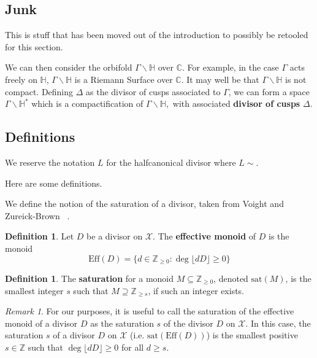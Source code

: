 \documentclass{amsart}
\theoremstyle{plain}
\theoremstyle{definition}
\newtheorem{defn}[thm]{Definition}
\theoremstyle{remark}
\newtheorem{rem}[thm]{Remark}
\numberwithin{equation}{section}
\newcommand\bh{{\mathbb H}}
\newcommand\BC{{\mathbb C}}
\newcommand\BZ{{\mathbb Z}}
\newcommand \sx{\mathscr X}
\newcommand \halfcan{L}
\newcommand \Eff{\text{Eff}}
\newcommand \sat{\text{sat}}
\begin{document}
\subsection{Junk}
This is stuff that has been moved out of the introduction to possibly
be retooled for this section.

We can then consider the
orbifold $\Gamma \backslash \bh$ over $\BC$. For example, in the
case $\Gamma$ acts freely on $\bh$, $\Gamma \backslash \bh$ is a
Riemann Surface over $\BC$. It may well be that $\Gamma \backslash
\bh$ is not compact. Defining $\Delta$ as the divisor of cusps
associated to $\Gamma$, we can form a space $\Gamma \backslash
\bh^*$ which is a compactification of $\Gamma \backslash \bh,$ with
associated {\bf divisor of cusps} $\Delta$.

\subsection{Definitions}
We reserve the notation $\halfcan$ for the halfcanonical divisor
where $\halfcan \sim $.

Here are some definitions.

We define the notion of the saturation of a divisor, taken from
Voight and Zureick-Brown ~\cite[Section 7.2]{vzb:stacky}.

\begin{defn}
Let $D$ be a divisor on $\sx$. The \textbf{effective monoid} of $D$
is the monoid
\[
	\Eff(D) = \{d \in \BZ_{\geq 0} : \deg \lfloor dD \rfloor \geq 0 \}
\]
\end{defn}

\begin{defn}
\label{defn:sat}
The \textbf{saturation} for a monoid $M \subseteq \BZ_{\geq 0}$,
denoted $\sat(M)$, is the smallest integer $s$ such that $M
\supseteq \BZ_{\geq s}$, if such an integer exists.
\end{defn}

\begin{rem}
For our purposes, it is useful to call the saturation of the
effective monoid of a divisor $D$ as the saturation $s$ of the
divisor $D$ on $\sx$. In this case, the saturation $s$ of a divisor
$D$ on $\sx$ (i.e. $\sat(\Eff(D))$) is the smallest positive $s \in
\BZ$ such that $\deg \lfloor dD \rfloor \geq 0$ for all $d \geq s$.
\end{rem}



\end{document}
